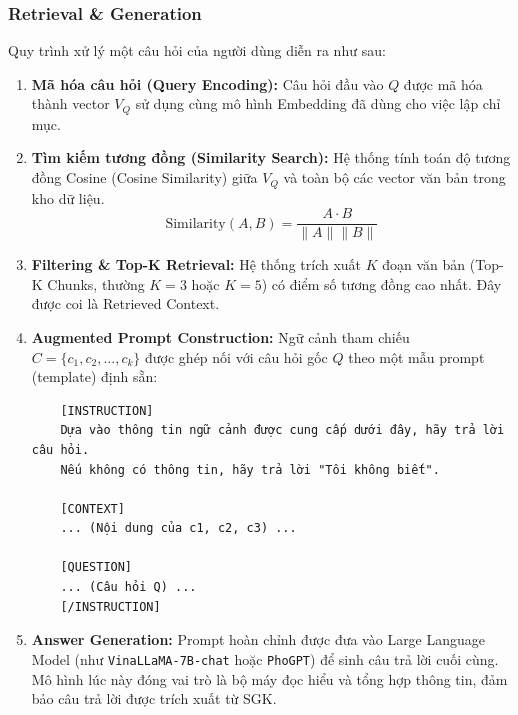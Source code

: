 \subsubsection{Retrieval \& Generation}
Quy trình xử lý một câu hỏi của người dùng diễn ra như sau:
\begin{enumerate}
    \item \textbf{Mã hóa câu hỏi (Query Encoding):}
    Câu hỏi đầu vào $Q$ được mã hóa thành vector $V_Q$ sử dụng cùng mô hình Embedding đã dùng cho việc lập chỉ mục.
    \item \textbf{Tìm kiếm tương đồng (Similarity Search):}
    Hệ thống tính toán độ tương đồng Cosine (Cosine Similarity) giữa $V_Q$ và toàn bộ các vector văn bản trong kho dữ liệu.
    \[ \text{Similarity}(A, B) = \frac{A \cdot B}{\|A\| \|B\|} \]
    
    \item \textbf{Filtering & Top-K Retrieval:}
    Hệ thống trích xuất $K$ đoạn văn bản (Top-K Chunks, thường $K=3$ hoặc $K=5$) có điểm số tương đồng cao nhất. Đây được coi là Retrieved Context.
    \item \textbf{Augmented Prompt Construction:}
    Ngữ cảnh tham chiếu $C = \{c_1, c_2, ..., c_k\}$ được ghép nối với câu hỏi gốc $Q$ theo một mẫu prompt (template) định sẵn:
    \begin{verbatim}
    [INSTRUCTION] 
    Dựa vào thông tin ngữ cảnh được cung cấp dưới đây, hãy trả lời câu hỏi. 
    Nếu không có thông tin, hãy trả lời "Tôi không biết".
    
    [CONTEXT]
    ... (Nội dung của c1, c2, c3) ...
    
    [QUESTION]
    ... (Câu hỏi Q) ...
    [/INSTRUCTION]
    \end{verbatim}
    \item \textbf{Answer Generation:}
    Prompt hoàn chỉnh được đưa vào Large Language Model (như \texttt{VinaLLaMA-7B-chat} hoặc \texttt{PhoGPT}) để sinh câu trả lời cuối cùng. Mô hình lúc này đóng vai trò là bộ máy đọc hiểu và tổng hợp thông tin, đảm bảo câu trả lời được trích xuất từ SGK.
\end{enumerate}